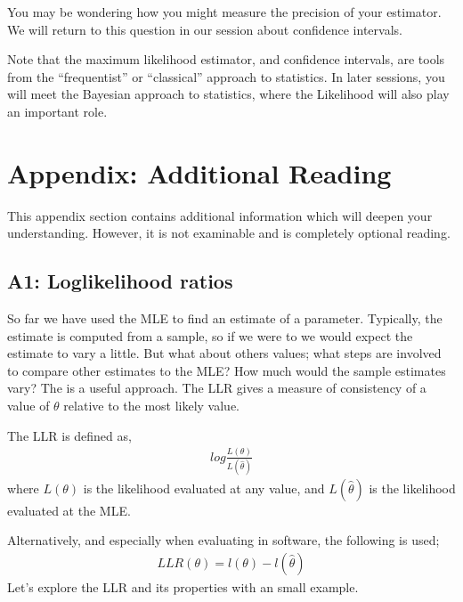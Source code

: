 \documentclass[letterpaper,10pt,english]{jupyterBook}
\begin{document}
\sphinxAtStartPar
You may be wondering how you might measure the precision of your estimator. We will return to this question in our session about confidence intervals.

\sphinxAtStartPar
Note that the maximum likelihood estimator, and confidence intervals, are tools from the “frequentist” or “classical” approach to statistics. In later sessions, you will meet the Bayesian approach to statistics, where the Likelihood will also play an important role.


\section{Appendix: Additional Reading}
\label{\detokenize{06.e. Maximum Likelihood:appendix-additional-reading}}\label{\detokenize{06.e. Maximum Likelihood::doc}}
\sphinxAtStartPar
This appendix section contains additional information which will deepen your understanding. However, it is not examinable and is completely optional reading.


\subsection{A1: Log\sphinxhyphen{}likelihood ratios}
\label{\detokenize{06.e. Maximum Likelihood:a1-log-likelihood-ratios}}
\sphinxAtStartPar
So far we have used the MLE to find an estimate of a parameter. Typically, the estimate is computed from a sample, so if we were to  we would expect the estimate to vary a little. But what about others values; what steps are involved to compare other estimates to the MLE? How much would the sample estimates vary? The  is a useful approach. The LLR gives a measure of consistency of a value of \(\theta\) relative to the most likely value.

\sphinxAtStartPar
The LLR is defined as,
\begin{equation*}
\begin{split} log\frac{L(\theta)}{L(\hat\theta)} \end{split}
\end{equation*}
\sphinxAtStartPar
where \(L(\theta)\) is the likelihood evaluated at any value, and \(L(\hat\theta)\) is the likelihood evaluated at the MLE.

\sphinxAtStartPar
Alternatively, and especially when evaluating in software, the following is used;
\begin{equation*}
\begin{split} LLR(\theta) = l(\theta)-l(\hat\theta) \end{split}
\end{equation*}
\sphinxAtStartPar
Let’s explore the LLR and its properties with an small example.
\end{document}

